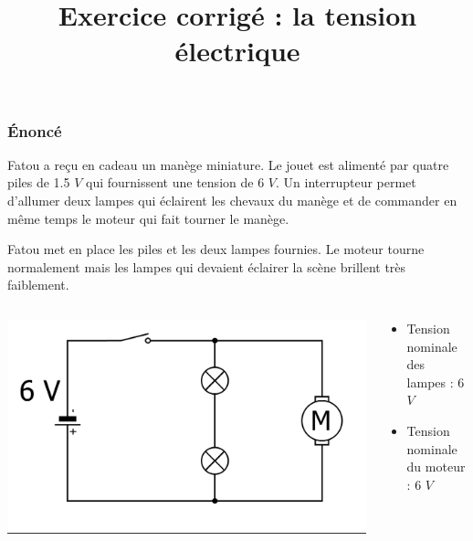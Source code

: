 \documentclass[xcolor={dvipsnames}]{beamer}
\title{Exercice corrigé : la tension électrique}
\begin{document}
\begin{frame}
  \titlepage 
\end{frame}


\begin{frame}
	\frametitle{\'Enoncé}
		
	Fatou a reçu en cadeau un manège miniature. Le jouet est alimenté par quatre piles de \num{1.5} $V$ qui fournissent une tension de 6 $V$. Un interrupteur permet d'allumer deux lampes qui éclairent les chevaux du manège et de commander en même temps le moteur qui fait tourner le manège.
	
	
	Fatou met en place les piles et les deux lampes fournies. Le moteur tourne normalement mais les lampes qui devaient éclairer la scène brillent très faiblement.\pause
	
	
	\begin{columns}
		\begin{column}{0.4\textwidth}
			\includegraphics[scale=0.2]{../1_schema}
			
		\end{column}
	
		\begin{column}{0.6\textwidth}
			\begin{itemize}
				\item Tension nominale des lampes : 6 $V$
				\item Tension nominale du moteur : 6 $V$
			\end{itemize}		
			
		\end{column}
	\end{columns}	
\end{frame}
\end{document}
